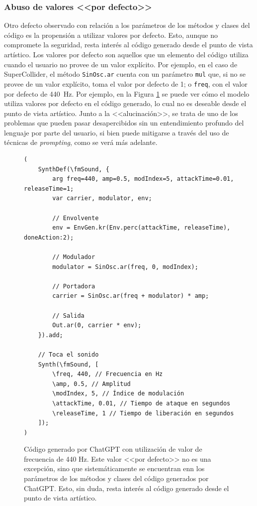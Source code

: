 \subsubsection{Abuso de valores <<por defecto>>}
Otro defecto observado con relación a los parámetros de los métodos y clases del código es la propensión a utilizar valores por defecto. Esto, aunque no compromete la seguridad, resta interés al código generado desde el punto de vista artístico. Los valores por defecto son aquellos que un elemento del código utiliza cuando el usuario no provee de un valor explícito. Por ejemplo, en el caso de SuperCollider, el método \texttt{SinOsc.ar} cuenta con un parámetro \texttt{mul} que, si no se provee de un valor explícito, toma el valor por defecto de 1; o \texttt{freq}, con el valor por defecto de \SI{440}{\hertz}. Por ejemplo, en la Figura \ref{fig:ChatGPT_valores_por_defecto} se puede ver cómo el modelo utiliza valores por defecto en el código generado, lo cual no es deseable desde el punto de vista artístico. Junto a la <<alucinación>>, se trata de uno de los problemas que pueden pasar desapercibidos sin un entendimiento profundo del lenguaje por parte del usuario, si bien puede mitigarse a través del uso de técnicas de \textit{prompting}, como se verá más adelante.

\begin{figure}[H]
    \caption[]{Código generado por ChatGPT con utilización de valor de frecuencia de 440 Hz. Este valor <<por defecto>> no es una excepción, sino que sistemáticamente se encuentran enn los parámetros de los métodos y clases del código generados por ChatGPT. Esto, sin duda, resta interés al código generado desde el punto de vista artístico.}
    \centering
    \begin{lstlisting}[style=SuperCollider-IDE, basicstyle=\footnotesize\ttfamily, numbers=none]
(
    SynthDef(\fmSound, {
        arg freq=440, amp=0.5, modIndex=5, attackTime=0.01, releaseTime=1;
        var carrier, modulator, env;
    
        // Envolvente
        env = EnvGen.kr(Env.perc(attackTime, releaseTime), doneAction:2);
    
        // Modulador
        modulator = SinOsc.ar(freq, 0, modIndex);
    
        // Portadora
        carrier = SinOsc.ar(freq + modulator) * amp;
    
        // Salida
        Out.ar(0, carrier * env);
    }).add;
    
    // Toca el sonido
    Synth(\fmSound, [
        \freq, 440, // Frecuencia en Hz
        \amp, 0.5, // Amplitud
        \modIndex, 5, // Índice de modulación
        \attackTime, 0.01, // Tiempo de ataque en segundos
        \releaseTime, 1 // Tiempo de liberación en segundos
    ]);
) 
    \end{lstlisting}
    \source{\propio}
    \label{fig:ChatGPT_valores_por_defecto}
\end{figure}



